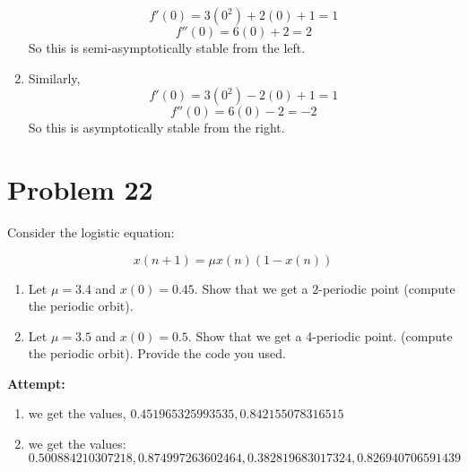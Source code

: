 \documentclass[12pt,letterpaper]{article}
\theoremstyle{definition}
\begin{document}
\begin{changemargin}{.5cm}{0cm}
\begin{enumerate}[label=(\roman*)]
    \begin{equation*}
        f'(0) = 3(0^2) + 2(0) +1 = 1
    \end{equation*}
    \begin{equation*}
        f''(0) = 6(0) + 2 = 2
    \end{equation*}
    So this is semi-asymptotically stable from the left.
    

  \item  Similarly,
      \begin{equation*}
        f'(0) = 3(0^2) - 2(0) +1 = 1
    \end{equation*}
    \begin{equation*}
        f''(0) = 6(0) - 2 = -2
    \end{equation*}
    So this is asymptotically stable from the right.

\end{enumerate}

\end{changemargin}

\newpage

\section*{Problem 22}
Consider the logistic equation:

\begin{equation*}
    x(n+1) = \mu x(n) (1-x(n))
\end{equation*}

\begin{enumerate}[label=(\roman*)]
    \item Let $\mu = 3.4$ and $x(0) = 0.45$. Show that we get a $2$-periodic point (compute the periodic orbit).
    \item Let $\mu=3.5$ and $x(0) =0.5$. Show that we get a 4-periodic point. (compute the periodic orbit). Provide the code you used.
\end{enumerate}

\textbf{Attempt:}
\begin{changemargin}{.5cm}{0cm}

\begin{enumerate}
    \item we get the values, $0.451965325993535,   0.842155078316515$
    
    \item we get the values:
    \begin{equation*}
        0.500884210307218 ,  0.874997263602464  , 0.382819683017324  , 0.826940706591439
    \end{equation*}
    
\end{enumerate}

\end{changemargin}
\newpage
\end{document}
